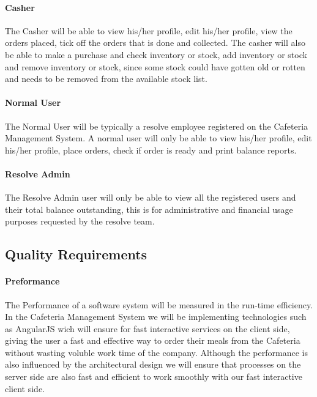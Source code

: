 \documentclass[12pt]{article}
\begin{document}
\paragraph{ Casher\\}
The Casher will be able to view his/her profile, edit his/her profile,  view the orders placed, tick off the orders that is done and collected. The casher will also be able to make a purchase and check inventory or stock, add inventory or stock and remove inventory or stock, since some stock could have gotten old or rotten and needs to be removed from the available stock list. 

\paragraph{ Normal User\\}
The Normal User will be typically a resolve employee registered on the Cafeteria Management System.  A normal user will only be able to view his/her profile, edit his/her profile, place orders, check if order is ready and print balance reports.

\paragraph{ Resolve Admin\\}
The Resolve Admin user will only be able to view all the registered users and their total balance outstanding, this is for administrative and financial usage purposes requested by the resolve team.



\subsection{Quality Requirements}

\paragraph{ Preformance\\}
The Performance of a software system will be measured in the run-time efficiency.  In the Cafeteria Management System we will be implementing technologies such as AngularJS wich will ensure for fast interactive services on the client side, giving the user a fast and effective way to order their meals from the Cafeteria without wasting voluble work time of the company.  Although the performance is also influenced by the architectural design we will ensure that processes on the server side are also fast and efficient to work smoothly with our fast interactive client side. 
\end{document}

